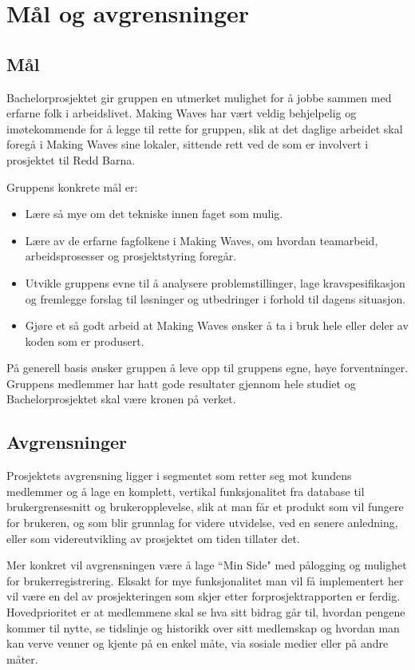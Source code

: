 \chapter{Mål og avgrensninger}
\section{Mål}
Bachelorprosjektet gir gruppen en utmerket mulighet for å jobbe sammen med erfarne folk i arbeidslivet. Making Waves har vært veldig behjelpelig og imøtekommende for å legge til rette for gruppen, slik at det daglige arbeidet skal foregå i Making Waves sine lokaler, sittende rett ved de som er involvert i prosjektet til Redd Barna.

Gruppens konkrete mål er:
\begin{itemize}
\item Lære så mye om det tekniske innen faget som mulig.
\item Lære av de erfarne fagfolkene i Making Waves, om hvordan teamarbeid, arbeidsprosesser og prosjektstyring foregår.
\item Utvikle gruppens evne til å analysere problemstillinger, lage kravspesifikasjon og fremlegge forslag til løsninger og utbedringer i forhold til dagens situasjon.
\item Gjøre et så godt arbeid at Making Waves ønsker å ta i bruk hele eller deler av koden som er produsert.
\end{itemize}

På generell basis ønsker gruppen å leve opp til gruppens egne, høye forventninger. Gruppens medlemmer har hatt gode resultater gjennom hele studiet og Bachelorprosjektet skal være kronen på verket.

\section{Avgrensninger}
Prosjektets avgrensning ligger i segmentet som retter seg mot kundens medlemmer og å lage en komplett, vertikal funksjonalitet fra database til brukergrensesnitt og brukeropplevelse, slik at man får et produkt som vil fungere for brukeren, og som blir grunnlag for videre utvidelse, ved en senere anledning, eller som videreutvikling av prosjektet om tiden tillater det.

Mer konkret vil avgrensningen være å lage ``Min Side" med pålogging og mulighet for brukerregistrering. Eksakt for mye funksjonalitet man vil få implementert her vil være en del av prosjekteringen som skjer etter forprosjektrapporten er ferdig. Hovedprioritet er at medlemmene skal se hva sitt bidrag går til, hvordan pengene kommer til nytte, se tidslinje og historikk over sitt medlemskap og hvordan man kan verve venner og kjente på en enkel måte, via sosiale medier eller på andre måter.

